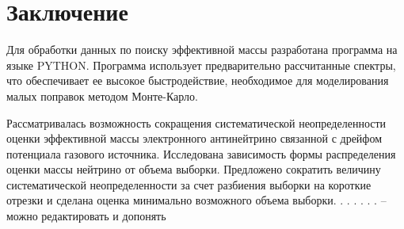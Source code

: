 ﻿\documentclass[a4paper,14pt]{extarticle}
\begin{document}
    \newpage
    \section{Заключение}
    Для обработки данных по поиску эффективной массы разработана программа на языке PYTHON. Программа
    использует предварительно рассчитанные спектры, что обеспечивает ее высокое быстродействие,
    необходимое для моделирования малых  поправок методом Монте-Карло.
    
    Рассматривалась возможность сокращения систематической неопределенности оценки эффективной массы
    электронного антинейтрино связанной с дрейфом потенциала газового источника. Исследована зависимость
    формы распределения оценки массы нейтрино от объема выборки. Предложено сократить величину
    систематической неопределенности за счет разбиения выборки на короткие отрезки и сделана оценка
    минимально возможного объема выборки.
    . . . . . . – можно редактировать и допонять
    
    
    \newpage
    \newrefcontext[sorting=none]
    \printbibliography[heading=bibnumbered]
\end{document}
